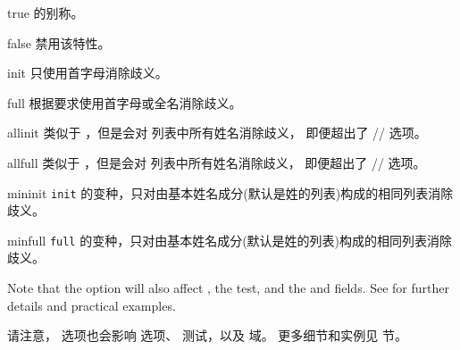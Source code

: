 \begin{optionlist}
\begin{valuelist}
\item[true] %
 的别称。
\item[false] %
禁用该特性。
\item[init] %
只使用首字母消除歧义。
\item[full] %
根据要求使用首字母或全名消除歧义。
\item[allinit] %
类似于 ，但是会对  列表中所有姓名消除歧义，
即便超出了 \slash {}\slash {} 选项。
\item[allfull] %
类似于 ，但是会对  列表中所有姓名消除歧义，
即便超出了 \slash {}\slash {} 选项。
\item[mininit] %
\texttt{init} 的变种，只对由基本姓名成分(默认是姓的列表)构成的相同列表消除歧义。

\item[minfull] %
\texttt{full} 的变种，只对由基本姓名成分(默认是姓的列表)构成的相同列表消除歧义。
\end{valuelist}
%

Note that the  option will also affect , the  test, and the  and  fields. See  for further details and practical examples.

请注意， 选项也会影响  选项、
 测试，以及  域。
更多细节和实例见  节。



\end{optionlist}

